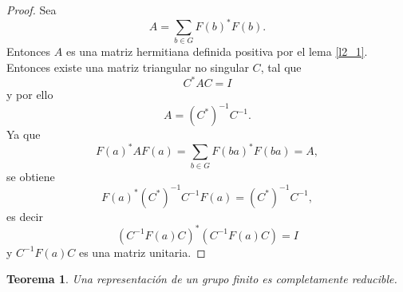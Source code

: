 \documentclass[12pt]{book}
\newtheorem{theorem}{Teorema}[section]
\theoremstyle{definition}
\newcounter{in}
\newcounter{ini}
\begin{document}
\begin{proof}
  Sea
  \begin{equation*}
    A=\sum_{b \in G} F \left(b\right)^{*}F\left(b\right).
  \end{equation*}
  Entonces $A$ es una matriz hermitiana definida positiva por el lema \ref{l2_1}. Entonces existe una matriz triangular no singular $C$, tal que
  \begin{equation*}
    C^{*}AC= I
  \end{equation*}
  y por ello
  \begin{equation}
    \label{eq:9}
    A=(C^{*})^{-1}C^{-1}.
  \end{equation}
  Ya que
  \begin{equation}
    \label{eq:10}
    F\left(a\right)^{*} AF\left(a\right)=\sum_{b \in G} F\left(ba\right)^{*} F\left(ba\right)=A,
  \end{equation}
  se obtiene
  \begin{equation}
    \label{eq:11}
    F\left(a\right)^{*}(C^{*})^{-1}C^{-1}F\left(a\right)=(C^{*})^{-1}C^{-1},
  \end{equation}
  es decir
  \begin{equation}
    \label{eq:12}
    (C^{-1}F(a)C)^{*}(C^{-1}F(a)C)=I
  \end{equation}
  y $C^{-1}F(a)C$ es una matriz unitaria.
\end{proof}
\begin{theorem}
  \label{t2_4}
  Una representación de un grupo finito es
  completamente reducible.
\end{theorem}
\end{document}

